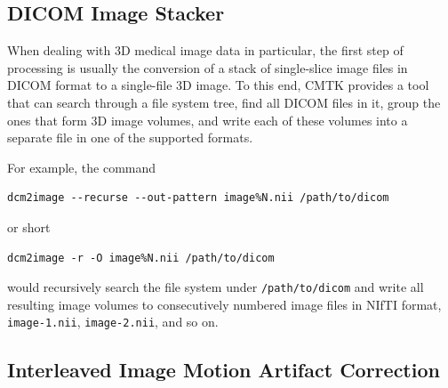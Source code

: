 \documentclass{InsightArticle}
\begin{document}
\subsection{DICOM Image Stacker}

When dealing with 3D medical image data in particular, the first step of
processing is usually the conversion of a stack of single-slice image files in
DICOM format to a single-file 3D image. To this end, CMTK provides a tool that
can search through a file system tree, find all DICOM files in it, group the
ones that form 3D image volumes, and write each of these volumes into a
separate file in one of the supported formats.

For example, the command
\begin{verbatim}
dcm2image --recurse --out-pattern image%N.nii /path/to/dicom
\end{verbatim}
or short
\begin{verbatim}
dcm2image -r -O image%N.nii /path/to/dicom
\end{verbatim}
would recursively search the file system under {\tt /path/to/dicom} and write
all resulting image volumes to consecutively numbered image files in NIfTI
format, {\tt image-1.nii},  {\tt image-2.nii}, and so on.

\subsection{Interleaved Image Motion Artifact Correction}
\end{document}
